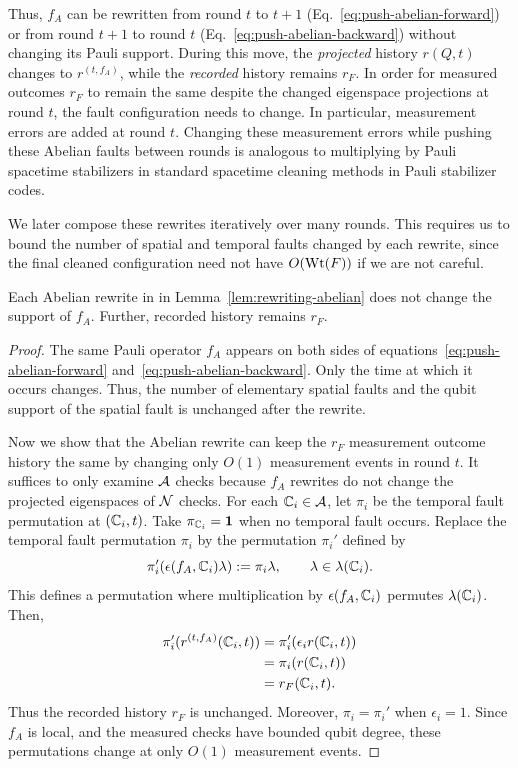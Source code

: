 \documentclass[11pt]{article}
\begin{document}
Thus, $f_A$ can be rewritten from round $t$ to $t+1$ (Eq.~\eqref{eq:push-abelian-forward}) or from round $t+1$ to round $t$ (Eq.~\eqref{eq:push-abelian-backward}) without changing its Pauli support.
During this move, the \textit{projected} history $r(Q,t)$ changes to $r^{(t,f_A)}$, while the \textit{recorded} history remains $r_F$.
In order for measured outcomes $r_F$ to remain the same despite the changed eigenspace projections at round $t$, the fault configuration needs to change. In particular, measurement errors are added at round $t$. Changing these measurement errors while pushing these Abelian faults between rounds is analogous to multiplying by Pauli spacetime stabilizers in standard spacetime cleaning methods in Pauli stabilizer codes.

We later compose these rewrites iteratively over many rounds. This requires us to bound the number of spatial and temporal faults changed by each rewrite, since the final cleaned configuration need not have $O(\operatorname{Wt}(F))$ if we are not careful.

\begin{corollary}
\label{cor:fault-support-abelian-rewrite}
    
    Each Abelian rewrite in in Lemma~\ref{lem:rewriting-abelian} does not change the support of $f_A$.
    Further, recorded history remains $r_F$. 
\end{corollary}
\begin{proof}
    The same Pauli operator $f_A$ appears on both sides of equations~\eqref{eq:push-abelian-forward} and~\eqref{eq:push-abelian-backward}. Only the time at which it occurs changes. Thus, the number of elementary spatial faults and the qubit support of the spatial fault is unchanged after the rewrite.
    
    Now we show that the Abelian rewrite can keep the $r_F$ measurement outcome history the same by changing only $O(1)$ measurement events in round $t$.
    It suffices to only examine $\mathcal{A}$ checks because $f_A$ rewrites do not change the projected eigenspaces of $\mathcal{N}$ checks.
    For each $\mathbb{C}_{i}\in \mathcal{A}$, let $\pi_{i}$ be the temporal fault permutation at $(\mathbb{C}_{i},t)$. Take $\pi_{\mathbb{C}_{i}}=\mathbf{1}$ when no temporal fault occurs. 
    Replace the temporal fault permutation $\pi_i$ by the permutation $\pi_i'$ defined by
    \[
    \pi_{i}'(\epsilon(f_A,\mathbb{C}_{i})\lambda ):= \pi_i {\lambda},\qquad \lambda\in \lambda(\mathbb{C}_{i}).
    \]
    This defines a permutation where multiplication by $\epsilon(f_A,\mathbb{C}_{i})$ permutes $\lambda(\mathbb{C}_{i})$.
    Then,
     \begin{align}
         \pi_i'(r^{(t,f_A)}(\mathbb{C}_{i},t)) &= \pi_i'(\epsilon_i r(\mathbb{C}_{i},t))\\
        &=\pi_i( r(\mathbb{C}_{i},t))\\
        &=r_F(\mathbb{C}_{i},t).
     \end{align}
    Thus the recorded history $r_F$ is unchanged.
    Moreover, $\pi_i=\pi_i'$ when $\epsilon_i=1$. Since $f_A$ is local, and the measured checks have bounded qubit degree, these permutations change at only $O(1)$ measurement events.    
\end{proof}
\end{document}
